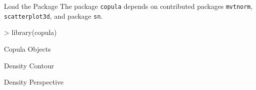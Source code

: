 \documentclass[%
ps,
]{prosper}
\begin{document}
\begin{slide}{Load the Package}
The package \texttt{copula} depends on contributed
packages \texttt{mvtnorm}, \texttt{scatterplot3d},
and package \texttt{sn}.

\begin{Schunk}
\begin{Sinput}
> library(copula)
\end{Sinput}
\end{Schunk}
  
\end{slide}

\begin{slide}{Copula Objects}
  
\end{slide}

\begin{slide}{Density Contour}
  
\end{slide}

\begin{slide}{Density Perspective}
  
\end{slide}
\end{document}
